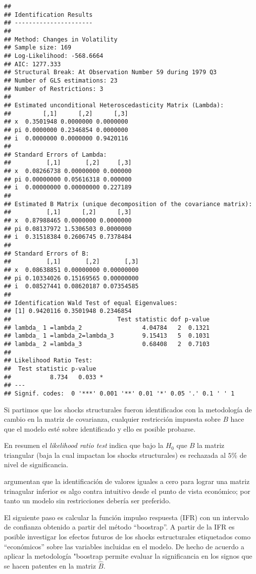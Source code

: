 \documentclass[
]{book}
\begin{document}
\begin{verbatim}
## 
## Identification Results
## ---------------------- 
## 
## Method: Changes in Volatility
## Sample size: 169
## Log-Likelihood: -568.6664
## AIC: 1277.333
## Structural Break: At Observation Number 59 during 1979 Q3
## Number of GLS estimations: 23
## Number of Restrictions: 3
## 
## Estimated unconditional Heteroscedasticity Matrix (Lambda):
##         [,1]      [,2]      [,3]
## x  0.3501948 0.0000000 0.0000000
## pi 0.0000000 0.2346854 0.0000000
## i  0.0000000 0.0000000 0.9420116
## 
## Standard Errors of Lambda:
##          [,1]       [,2]     [,3]
## x  0.08266738 0.00000000 0.000000
## pi 0.00000000 0.05616318 0.000000
## i  0.00000000 0.00000000 0.227189
## 
## Estimated B Matrix (unique decomposition of the covariance matrix): 
##          [,1]      [,2]      [,3]
## x  0.87988465 0.0000000 0.0000000
## pi 0.08137972 1.5306503 0.0000000
## i  0.31518384 0.2606745 0.7378484
## 
## Standard Errors of B:
##          [,1]       [,2]       [,3]
## x  0.08638851 0.00000000 0.00000000
## pi 0.10334026 0.15169565 0.00000000
## i  0.08527441 0.08620187 0.07354585
## 
## Identification Wald Test of equal Eigenvalues:
## [1] 0.9420116 0.3501948 0.2346854
##                              Test statistic dof p-value
## lambda_ 1 =lambda_2                 4.04784   2  0.1321
## lambda_ 1 =lambda_2=lambda_3        9.15413   5  0.1031
## lambda_ 2 =lambda_3                 0.68408   2  0.7103
## 
## Likelihood Ratio Test: 
##  Test statistic p-value  
##           8.734   0.033 *
## ---
## Signif. codes:  0 '***' 0.001 '**' 0.01 '*' 0.05 '.' 0.1 ' ' 1
\end{verbatim}

Si partimos que los shocks structurales fueron identificados con la metodología de cambio en la matriz de covarianza, cualquier restricción impuesta sobre \(B\) hace que el modelo esté sobre identificado y ello es posible probarse.

En resumen el \emph{likelihood ratio test} indica que bajo la \(H_{0}\)
que \(B\) la matriz triangular (baja la cual impactan los shocks structurales) es rechazada al \(5\%\) de nivel de significancia.

\citet{Herwartz2016} argumentan que la identificación de valores iguales a cero para lograr una matriz trinagular inferior es algo contra intuitivo desde el punto de vista económico; por tanto un modelo sin restricciones debería ser preferido.

El siguiente paso es calcular la función impulso respuesta (IFR) con un intervalo de confianza obtenido a partir del método ``boostrap''. A partir de la IFR es posible investigar los efectos futuros de los shocks estructurales etiquetados como ``económicos'' sobre las variables
incluidas en el modelo. De hecho de acuerdo a \citet{Herwartz18} aplicar la metodología "boostrap permite evaluar la significancia en los signos que se hacen patentes en la matriz \(\hat{B}\).
\end{document}
